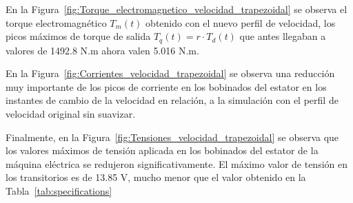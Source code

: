 \documentclass{article}
\begin{document}
En la Figura~\ref{fig:Torque_electromagnetico_velocidad_trapezoidal} se observa el torque electromagnético \(T_m(t)\) obtenido con el nuevo perfil de velocidad, los picos máximos de torque de salida \(T_q(t) = r\cdot T_d(t)\) que antes llegaban a valores de 1492.8 N.m ahora valen 5.016 N.m.

En la Figura~\ref{fig:Corrientes_velocidad_trapezoidal} se observa una reducción muy importante de los picos de corriente en los bobinados del estator en los instantes de cambio de la velocidad en relación, a la simulación con el perfil de velocidad original sin suavizar.

Finalmente, en la Figura~\ref{fig:Tensiones_velocidad_trapezoidal} se observa que los valores máximos de tensión aplicada en los bobinados del estator de la máquina eléctrica se redujeron significativamente. El máximo valor de tensión en los transitorios es de 13.85 V, mucho menor que el valor obtenido en la Tabla~\ref{tab:specifications}
\end{document}
